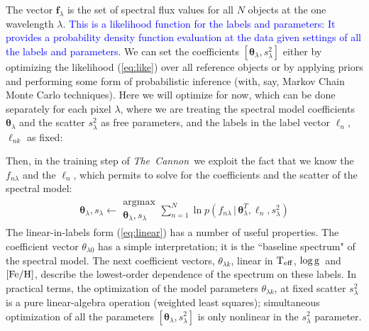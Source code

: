\documentclass[12pt, preprint]{aastex}
\newcommand{\tc}{\textsl{The~Cannon}}
\newcommand{\set}[1]{\bm{#1}}
\newcommand{\starlabel}{\ell}
\newcommand{\starlabelvec}{\set{\starlabel}}
\newcommand{\given}{\,|\,}
\newcommand{\teff}{\mbox{$\rm T_{eff}$}}
\newcommand{\feh}{\mbox{$\rm [Fe/H]$}}
\newcommand{\logg}{\mbox{$\rm \log g$}}
\begin{document}
The vector $\set{f}_\lambda$ is the set of spectral flux values for
all $N$ objects at the one wavelength $\lambda$. \textcolor{blue}{This is a likelihood function for the labels and parameters:  It provides a probability density function evaluation at the data given settings of all the labels and parameters.}
We can set the coefficients $[\set{\theta}_\lambda,s_\lambda^2]$ either by
optimizing the likelihood (\ref{eq:like}) over all reference objects or by applying priors and
performing some form of probabilistic inference (with, say, Markov
Chain Monte Carlo techniques).
Here we will optimize for now, which can be done separately for each pixel $\lambda$, where
we are treating the spectral model coefficients $\set{\theta}_\lambda$ and the scatter $s_\lambda^2$ as free parameters, and the
labels in the label vector $\starlabelvec_n$, $\starlabel_{nk}$ as fixed:

Then, in the training step of \tc\ we exploit the fact that we know the $f_{n\lambda}$
and the $\starlabelvec_n$, which permits to solve for the coefficients and the scatter of the spectral model:
\begin{eqnarray}
\set{\theta}_\lambda,s_\lambda \leftarrow \substack{\mbox{argmax}\\{\set{\theta}_\lambda}, s_\lambda}
\sum_{n=1}^N \ln p(f_{n\lambda}\given\set{\theta}^T_\lambda, \starlabelvec_n, s_\lambda^2)
\label{eq:trainingstep}
\end{eqnarray}
The linear-in-labels form (\ref{eq:linear}) has a number of useful properties.
The coefficient vector $\theta_{\lambda 0}$ has a simple interpretation;
it is the ``baseline spectrum" of the spectral model. 
The next coefficient vectors,  $\theta_{\lambda k}$, linear in \teff , \logg ~and \feh,
describe the lowest-order dependence of the spectrum on these labels.
In practical terms, the optimization of the model parameters $\theta_{\lambda k}$, at fixed scatter
$s_\lambda^2$ is a pure linear-algebra operation (weighted least
squares); simultaneous optimization of all the parameters
$[\set{\theta}_\lambda,s_\lambda^2]$ is only nonlinear in the $s_\lambda^2$
parameter.
\end{document}
